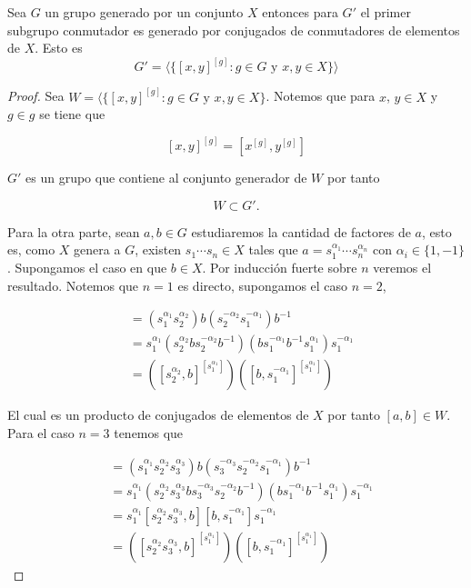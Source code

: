\begin{pr} \label{pr:Derivados_y_generadores}

Sea $G$ un grupo  generado por un conjunto $X$ entonces para $G'$ el primer subgrupo conmutador es generado por conjugados de conmutadores de elementos de $X$. Esto es
$$G'=\langle\{ [x,y]^{[g]}: g \in G \text{ y } x,y \in X \} \rangle$$
\end{pr}

\begin{proof}

Sea $W=\langle\{ [x,y]^{[g]} : g \in G \text{ y } x,y \in X \}$. 
Notemos que para $x$, $y \in X$ y $g \in g$ se tiene que 

$$[x,y]^{[g]}=[x^{[g]},y^{[g]}]$$

$G'$ es un grupo que contiene al conjunto generador de $W$ por tanto

$$W \subset  G'.$$

Para la otra parte, sean $a, b \in G$ estudiaremos la cantidad de factores de  $a$, esto es, como $X$ genera a $G$, existen $s_1 \cdots s_n \in X$ tales que $a= s_1^{\alpha_1} \cdots s_n^{\alpha_n}$ con $\alpha_i \in \{1, -1\}$. Supongamos el caso en que $b \in X$. Por inducción fuerte sobre $n$ veremos el resultado. Notemos que $n=1$ es directo, supongamos el caso $n=2$,

\begin{align*}
[s_1^{\alpha_1}s_2^{\alpha_2},b] & =(s_1^{\alpha_1}s_2^{\alpha_2})b(s_2^{-\alpha_2}s_1^{-\alpha_1})b^{-1}\\
& = s_1^{\alpha_1}(s_2^{\alpha_2}bs_2^{-\alpha_2}b^{-1})(bs_1^{-\alpha_1}b^{-1}s_1^{\alpha_1})s_1^{-\alpha_1} \\
& = ([s_2^{\alpha_2},b]^{[s_1^{\alpha_1}]})([b,s_1^{-\alpha_1}]^{[s_1^{\alpha_1}]}) 
\end{align*}


El cual es un producto de conjugados de elementos de $X$ por 
tanto $[a,b] \in W.$ Para el caso $n=3$ tenemos que 

\begin{align*}
[s_1^{\alpha_1}s_2^{\alpha_2}s_3^{\alpha_3},b] & =(s_1^{\alpha_1}s_2^{\alpha_2}s_3^{\alpha_3})b(s_3^{-\alpha_3}s_2^{-\alpha_2}s_1^{-\alpha_1})b^{-1} \\
& = s_1^{\alpha_1}(s_2^{\alpha_2}s_3^{\alpha_3}bs_3^{-\alpha_3}s_2^{-\alpha_2}b^{-1})(bs_1^{-\alpha_1}b^{-1}s_1^{\alpha_1})s_1^{-\alpha_1} \\ 
& = s_1^{\alpha_1}[s_2^{\alpha_2}s_3^{\alpha_3},b][b,s_1^{-\alpha_1}]s_1^{-\alpha_1} \\
& =([s_2^{\alpha_2}s_3^{\alpha_3},b]^{[s_1^{\alpha_1}]})([b,s_1^{-\alpha_1}]^{[s_1^{\alpha_1}]})
\end{align*}


\end{proof}
